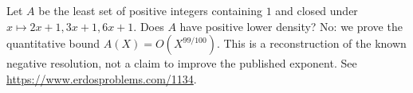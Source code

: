 Let \(A\) be the least set of positive integers containing \(1\) and closed under \(x\mapsto2x+1,3x+1,6x+1\). Does \(A\) have positive lower density? No: we prove the quantitative bound \(A(X)=O(X^{99/100})\). This is a reconstruction of the known negative resolution, not a claim to improve the published exponent. See \url{https://www.erdosproblems.com/1134}.
